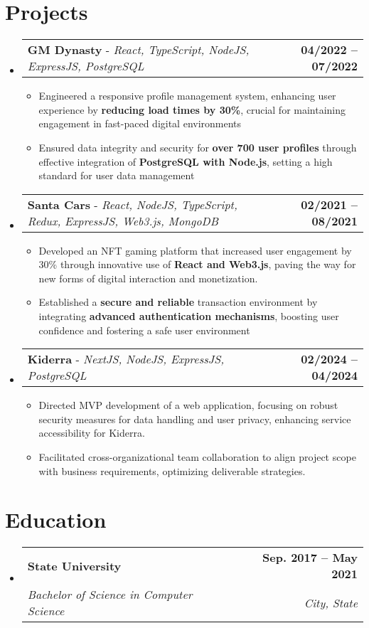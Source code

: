 \documentclass[letterpaper,11pt]{article}
\makeatletter
\newcommand{\resumeItem}[1]{
  \item\small{
    {#1 \vspace{-2pt}}
  }
}
\newcommand{\resumeSubheading}[4]{
  \vspace{-2pt}\item
    \begin{tabular*}{1.0\textwidth}[t]{l@{\extracolsep{\fill}}r}
      \textbf{#1} & \textbf{\small #2} \\
      \textit{\small#3} & \textit{\small #4} \\
    \end{tabular*}\vspace{-7pt}
}
\newcommand{\resumeProjectHeading}[2]{
    \item
    \begin{tabular*}{1.001\textwidth}{l@{\extracolsep{\fill}}r}
      \small#1 & \textbf{\small #2}\\
    \end{tabular*}\vspace{-7pt}
}
\newcommand{\resumeSubHeadingListStart}{\begin{itemize}[leftmargin=0.0in, label={}]}
\newcommand{\resumeSubHeadingListEnd}{\end{itemize}}
\newcommand{\resumeItemListStart}{\begin{itemize}}
\newcommand{\resumeItemListEnd}{\end{itemize}\vspace{-5pt}}
\makeatother
\begin{document}
\section{Projects}
  \resumeSubHeadingListStart
    \resumeProjectHeading
        {\textbf{GM Dynasty} - \emph{React, TypeScript, NodeJS, ExpressJS, PostgreSQL}}{04/2022 -- 07/2022}
        \resumeItemListStart
          \resumeItem{Engineered a responsive profile management system, enhancing user experience by \textbf{reducing load times by 30\%}, crucial for maintaining engagement in fast-paced digital environments}
          \resumeItem{Ensured data integrity and security for \textbf{over 700 user profiles} through effective integration of \textbf{PostgreSQL with Node.js}, setting a high standard for user data management}
        \resumeItemListEnd
        \vspace{-16pt}
    \resumeProjectHeading
        {\textbf{Santa Cars} - \emph{React, NodeJS, TypeScript, Redux, ExpressJS, Web3.js, MongoDB}}{02/2021 -- 08/2021}
        \resumeItemListStart
          \resumeItem{Developed an NFT gaming platform that increased user engagement by 30\% through innovative use of \textbf{React and Web3.js}, paving the way for new forms of digital interaction and monetization.}
          \resumeItem{Established a \textbf{secure and reliable} transaction environment by integrating \textbf{advanced authentication mechanisms}, boosting user confidence and fostering a safe user environment}
        \resumeItemListEnd
                \vspace{-16pt}
    \resumeProjectHeading
        {\textbf{Kiderra} - \emph{NextJS, NodeJS, ExpressJS, PostgreSQL}}{02/2024 -- 04/2024}
        \resumeItemListStart
          \resumeItem{Directed MVP development of a web application, focusing on robust security measures for data handling and user privacy, enhancing service accessibility for Kiderra.}
          \resumeItem{Facilitated cross-organizational team collaboration to align project scope with business requirements, optimizing deliverable strategies.}
        \resumeItemListEnd
  \resumeSubHeadingListEnd
\vspace{-15pt}

\section{Education}
  \resumeSubHeadingListStart
    \resumeSubheading
      {State University}{Sep. 2017 -- May 2021}
      {Bachelor of Science in Computer Science}{City, State}
  \resumeSubHeadingListEnd
\end{document}
